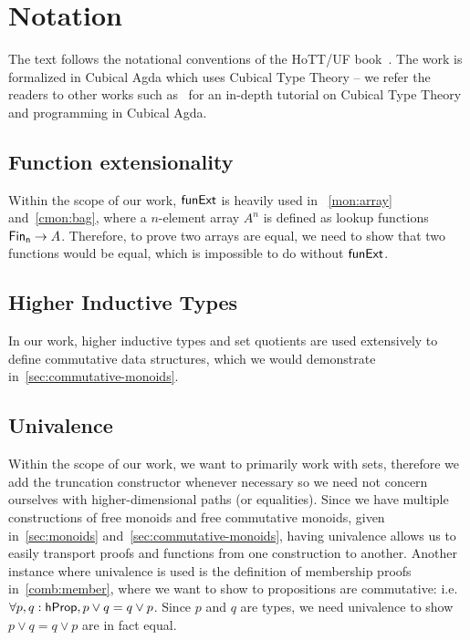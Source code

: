 
\section{Notation}\label{sec:notation}
The text follows the notational conventions of the HoTT/UF book~\cite{univalentfoundationsprogramHomotopyTypeTheory2013}.
%
The work is formalized in Cubical Agda which uses Cubical Type Theory --
we refer the readers to other works such as~\cite{vezzosiCubicalAgdaDependently2019}
for an in-depth tutorial on Cubical Type Theory and programming in Cubical Agda.

\begin{toappendix}
    \subsection{Function extensionality}

    Within the scope of our work, $\operatorname{\mathsf{funExt}}$ is heavily used in
    ~\cref{mon:array} and~\cref{cmon:bag}, where a $n$-element array $A^n$ is defined as lookup functions
    $\Fin[n] \to A$. Therefore, to prove two arrays are equal, we need to show that two functions would be
    equal, which is impossible to do without $\operatorname{\mathsf{funExt}}$.

    \subsection{Higher Inductive Types}

    In our work, higher inductive types and set quotients are used extensively to define commutative
    data structures, which we would demonstrate in~\cref{sec:commutative-monoids}.

    \subsection{Univalence}\label{types:univalence}

    Within the scope of our work, we want to primarily work with
    sets, therefore we add the truncation constructor whenever necessary so we need not concern ourselves
    with higher-dimensional paths (or equalities). Since we have multiple constructions of free monoids
    and free commutative monoids, given in~\cref{sec:monoids} and~\cref{sec:commutative-monoids},
    having univalence allows us to easily transport proofs and functions from one construction to another.
    Another instance where univalence is used is the definition of membership proofs in~\cref{comb:member},
    where we want to show to propositions are commutative: i.e. $\forall p, q: \mathsf{hProp}, p \vee q = q \vee p$.
    Since $p$ and $q$ are types, we need univalence to show $p \vee q = q \vee p$ are in fact equal.
\end{toappendix}

